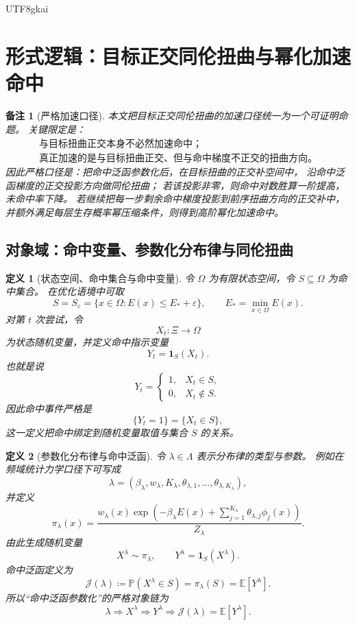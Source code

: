 \documentclass[12pt]{article}
\newtheorem{definition}{定义}[section]
\newtheorem{remark}{备注}[section]
\newcommand{\DefEq}{\coloneqq}
\begin{document}
\begin{CJK*}{UTF8}{gkai}
\section{形式逻辑：目标正交同伦扭曲与幂化加速命中}
\label{sec:tex55-orthogonal-twist-power-hitting}

\begin{remark}[严格加速口径]
本文把目标正交同伦扭曲的加速口径统一为一个可证明命题。
关键限定是：
\[
  \boxed{
  \begin{gathered}
  \text{与目标扭曲正交本身不必然加速命中；}\\
  \text{真正加速的是与目标扭曲正交、但与命中梯度不正交的扭曲方向。}
  \end{gathered}
  }
\]
因此严格口径是：把命中泛函参数化后，在目标扭曲的正交补空间中，
沿命中泛函梯度的正交投影方向做同伦扭曲；
若该投影非零，则命中对数胜算一阶提高，未命中率下降。
若继续把每一步剩余命中梯度投影到前序扭曲方向的正交补中，
并额外满足每层生存概率幂压缩条件，则得到高阶幂化加速命中。
\end{remark}

\subsection{对象域：命中变量、参数化分布律与同伦扭曲}
\label{subsec:tex55-orthogonal-objects}

\begin{definition}[状态空间、命中集合与命中变量]
\label{def:tex55-orthogonal-hit-variable}
令 \(\Omega\) 为有限状态空间，令 \(S\subseteq\Omega\) 为命中集合。
在优化语境中可取
\[
  S=S_\varepsilon
  =
  \{x\in\Omega:E(x)\le E_*+\varepsilon\},
  \qquad
  E_*=\min_{x\in\Omega}E(x).
\]
对第 \(t\) 次尝试，令
\[
  X_t:\Xi\to\Omega
\]
为状态随机变量，并定义命中指示变量
\[
  Y_t=\mathbf 1_S(X_t).
\]
也就是说
\[
  Y_t=
  \begin{cases}
  1,&X_t\in S,\\
  0,&X_t\notin S.
  \end{cases}
\]
因此命中事件严格是
\[
  \{Y_t=1\}=\{X_t\in S\},
\]
这一定义把命中绑定到随机变量取值与集合 \(S\) 的关系。
\end{definition}

\begin{definition}[参数化分布律与命中泛函]
\label{def:tex55-orthogonal-param-law}
令 \(\lambda\in\Lambda\) 表示分布律的类型与参数。
例如在频域统计力学口径下可写成
\[
  \lambda=(\beta_\lambda,w_\lambda,K_\lambda,
  \theta_{\lambda,1},\ldots,\theta_{\lambda,K_\lambda}),
\]
并定义
\[
  \pi_\lambda(x)
  =
  \frac{
  w_\lambda(x)
  \exp\left(
  -\beta_\lambda E(x)
  +
  \sum_{j=1}^{K_\lambda}
  \theta_{\lambda,j}\phi_j(x)
  \right)
  }{
  Z_\lambda
  }.
\]
由此生成随机变量
\[
  X^\lambda\sim\pi_\lambda,
  \qquad
  Y^\lambda=\mathbf 1_S(X^\lambda).
\]
命中泛函定义为
\[
  \mathcal J(\lambda)
  \DefEq
  \mathbb P(X^\lambda\in S)
  =
  \pi_\lambda(S)
  =
  \mathbb E[Y^\lambda].
\]
所以“命中泛函参数化”的严格对象链为
\[
  \boxed{
  \lambda
  \Longrightarrow
  X^\lambda
  \Longrightarrow
  Y^\lambda
  \Longrightarrow
  \mathcal J(\lambda)=\mathbb E[Y^\lambda].
  }
\]
\end{definition}


\end{CJK*}
\end{document}
